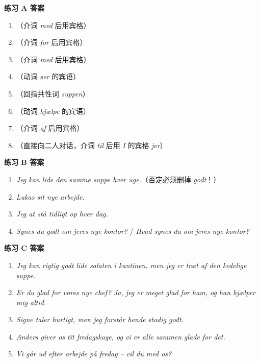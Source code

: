\begin{answerbox}
\textbf{练习 A 答案}
\begin{enumerate}
  \item {}（介词 \textit{med} 后用宾格）
  \item {}（介词 \textit{for} 后用宾格）
  \item {}（介词 \textit{med} 后用宾格）
  \item {}（动词 \textit{ser} 的宾语）
  \item {}（回指共性词 \textit{suppen}）
  \item {}（动词 \textit{hjælpe} 的宾语）
  \item {}（介词 \textit{af} 后用宾格）
  \item {}（直接向二人对话，介词 \textit{til} 后用 \textit{I} 的宾格 \textit{jer}）
\end{enumerate}

\textbf{练习 B 答案}
\begin{enumerate}
  \item \textit{Jeg kan  lide den samme suppe hver uge.}（否定必须删掉 \textit{godt}！）
  \item \textit{Lukas  sit nye arbejde.}
  \item \textit{Jeg  at stå tidligt op hver dag.}
  \item \textit{Synes du godt om jeres nye kontor?} / \textit{Hvad synes du om jeres nye kontor?}
\end{enumerate}

\textbf{练习 C 答案}
\begin{enumerate}
  \item \textit{Jeg kan rigtig godt lide salaten i kantinen, men jeg er træt af den kedelige suppe.}
  \item \textit{Er du glad for vores nye chef? Ja, jeg er meget glad for ham, og han hjælper mig altid.}
  \item \textit{Signe taler hurtigt, men jeg forstår hende stadig godt.}
  \item \textit{Anders giver os tit fredagskage, og vi er alle sammen glade for det.}
  \item \textit{Vi går ud efter arbejde på fredag – vil du med os?}
\end{enumerate}


\end{answerbox}

